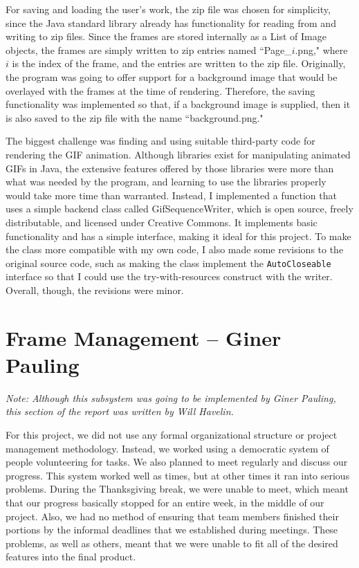 \documentclass[10 pt]{scrartcl}
\begin{document}
For saving and loading the user's work, the zip file was chosen for simplicity, since the Java standard library already has functionality for reading from and writing to zip files. Since the frames are stored internally as a List of Image objects, the frames are simply written to zip entries named ``Page\_$i$.png," where $i$ is the index of the frame, and the entries are written to the zip file. Originally, the program was going to offer support for a background image that would be overlayed with the frames at the time of rendering. Therefore, the saving functionality was implemented so that, if a background image is supplied, then it is also saved to the zip file with the name ``background.png."

The biggest challenge was finding and using suitable third-party code for rendering the GIF animation. Although libraries exist for manipulating animated GIFs in Java, the extensive features offered by those libraries were more than what was needed by the program, and learning to use the libraries properly would take more time than warranted. Instead, I implemented a function that uses a simple backend class called GifSequenceWriter, which is open source, freely distributable, and licensed under Creative Commons. It implements basic functionality and has a simple interface, making it ideal for this project. To make the class more compatible with my own code, I also made some revisions to the original source code, such as making the class implement the \verb|AutoCloseable| interface so that I could use the try-with-resources construct with the writer. Overall, though, the revisions were minor.

\section{Frame Management -- Giner Pauling}

\emph{Note: Although this subsystem was going to be implemented by Giner Pauling, this section of the report was written by Will Havelin.}

For this project, we did not use any formal organizational structure or project management methodology. Instead, we worked using a democratic system of people volunteering for tasks. We also planned to meet regularly and discuss our progress. This system worked well as times, but at other times it ran into serious problems. During the Thanksgiving break, we were unable to meet, which meant that our progress basically stopped for an entire week, in the middle of our project. Also, we had no method of ensuring that team members finished their portions by the informal deadlines that we established during meetings. These problems, as well as others, meant that we were unable to fit all of the desired features into the final product.

%
\end{document}
